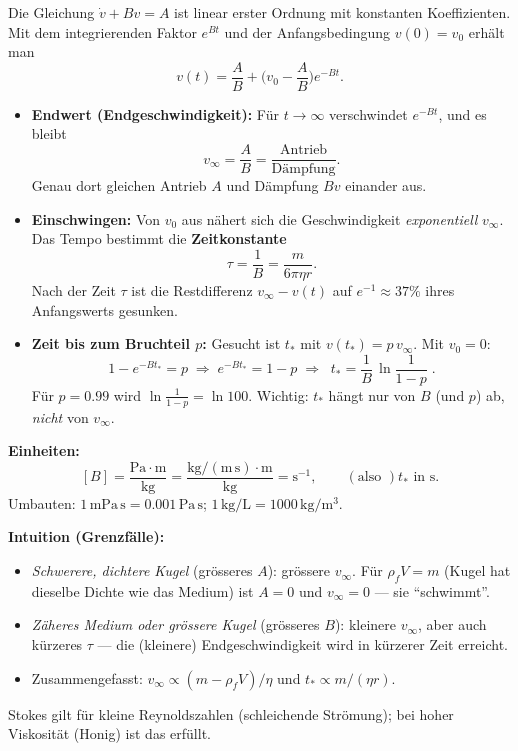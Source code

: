 \begin{werkzeugkasten}
Die Gleichung $\dot v + Bv = A$ ist linear erster Ordnung mit konstanten
Koeffizienten. Mit dem integrierenden Faktor $e^{Bt}$ und der
Anfangsbedingung $v(0)=v_0$ erhält man
\begin{equation}
  v(t)=\frac{A}{B}+\Big(v_0-\frac{A}{B}\Big)e^{-Bt}.
\end{equation}
\begin{itemize}
  \item \textbf{Endwert (Endgeschwindigkeit):} Für $t\to\infty$ verschwindet
        $e^{-Bt}$, und es bleibt
        \[ v_\infty=\frac{A}{B}=\frac{\text{Antrieb}}{\text{Dämpfung}}. \]
        Genau dort gleichen Antrieb $A$ und Dämpfung $B v$ einander aus.
  \item \textbf{Einschwingen:} Von $v_0$ aus nähert sich die Geschwindigkeit
        \emph{exponentiell} $v_\infty$. Das Tempo bestimmt die
        \textbf{Zeitkonstante}
        \[ \tau=\frac{1}{B}=\frac{m}{6\pi\eta r}. \]
        Nach der Zeit $\tau$ ist die Restdifferenz $v_\infty-v(t)$ auf
        $e^{-1}\approx 37\%$ ihres Anfangswerts gesunken.
  \item \textbf{Zeit bis zum Bruchteil $p$:} Gesucht ist $t_*$ mit
        $v(t_*)=p\,v_\infty$. Mit $v_0=0$:
        \[ 1-e^{-Bt_*}=p \;\Rightarrow\;
           e^{-Bt_*}=1-p \;\Rightarrow\;
           \boxed{\;t_*=\frac1B\,\ln\frac{1}{1-p}\;} .
        \]
        Für $p=0.99$ wird $\ln\frac{1}{1-p}=\ln100$. Wichtig: $t_*$ hängt nur
        von $B$ (und $p$) ab, \emph{nicht} von $v_\infty$.
\end{itemize}
\end{werkzeugkasten}

\begin{werkzeugkasten}
\textbf{Einheiten:}
\[
 [B]=\frac{\mathrm{Pa\cdot m}}{\mathrm{kg}}
 =\frac{\mathrm{kg/(m\,s)\cdot m}}{\mathrm{kg}}=\mathrm{s^{-1}},
 \qquad (\text{also }) t_* \text{ in } \mathrm{s}.
\]
Umbauten: $1\,\mathrm{mPa\,s}=0.001\,\mathrm{Pa\,s}$;
$1\,\mathrm{kg/L}=1000\,\mathrm{kg/m^3}$.

\textbf{Intuition (Grenzfälle):}
\begin{itemize}
  \item \emph{Schwerere, dichtere Kugel} (grösseres $A$): grössere $v_\infty$.
        Für $\rho_f V = m$ (Kugel hat dieselbe Dichte wie das Medium) ist
        $A=0$ und $v_\infty=0$ --- sie ``schwimmt''.
  \item \emph{Zäheres Medium oder grössere Kugel} (grösseres $B$): kleinere
        $v_\infty$, aber auch kürzeres $\tau$ --- die (kleinere)
        Endgeschwindigkeit wird in kürzerer Zeit erreicht.
  \item Zusammengefasst: $v_\infty\propto (m-\rho_f V)/\eta$ und
        $t_*\propto m/(\eta r)$.
\end{itemize}
Stokes gilt für kleine Reynoldszahlen (schleichende Strömung); bei hoher
Viskosität (Honig) ist das erfüllt.
\end{werkzeugkasten}

